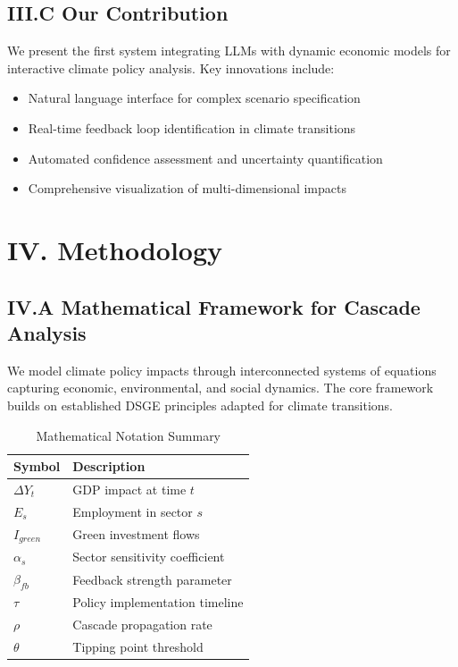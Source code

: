 \documentclass[10pt,twocolumn]{article}
\begin{document}
\subsection{III.C Our Contribution}

We present the first system integrating LLMs with dynamic economic models for interactive climate policy analysis. Key innovations include:
\begin{itemize}
\item Natural language interface for complex scenario specification
\item Real-time feedback loop identification in climate transitions
\item Automated confidence assessment and uncertainty quantification
\item Comprehensive visualization of multi-dimensional impacts
\end{itemize}

\section{IV. Methodology}

\subsection{IV.A Mathematical Framework for Cascade Analysis}

We model climate policy impacts through interconnected systems of equations capturing economic, environmental, and social dynamics. The core framework builds on established DSGE principles \citep{agarwala2021climate} adapted for climate transitions.

\begin{table}[!h]
\centering
\caption{Mathematical Notation Summary}
\label{tab:notation}
\small
\begin{tabular}{ll}
\toprule
Symbol & Description \\
\midrule
$\Delta Y_t$ & GDP impact at time $t$ \\
$E_s$ & Employment in sector $s$ \\
$I_{green}$ & Green investment flows \\
$\alpha_s$ & Sector sensitivity coefficient \\
$\beta_{fb}$ & Feedback strength parameter \\
$\tau$ & Policy implementation timeline \\
$\rho$ & Cascade propagation rate \\
$\theta$ & Tipping point threshold \\
\bottomrule
\end{tabular}
\end{table}
\end{document}
